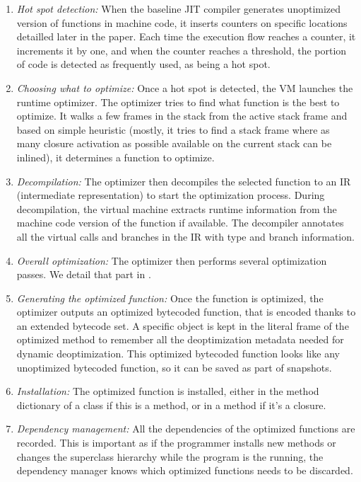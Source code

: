 \documentclass[a4paper,12pt,twoside]{../includes/ThesisStyle}
\begin{document}
\begin{enumerate}
\item \emph{Hot spot detection:} When the baseline JIT compiler  generates unoptimized version of functions in machine code, it  inserts counters on specific locations detailled later in the paper. Each time the execution flow reaches a counter, it increments it by one, and when the counter reaches a threshold, the portion of code is detected as frequently used, \ie as being a hot spot.
\item \emph{Choosing what to optimize:} Once a hot spot is detected, the VM launches the runtime optimizer. The optimizer tries to find what function is the best to optimize. It walks a few frames in the stack from the active stack frame and based on simple heuristic (mostly, it tries to find a stack frame where as many closure activation as possible available on the current stack can be inlined), it determines a function to optimize.
\item \emph{Decompilation:} The optimizer then decompiles the selected function to an IR (intermediate representation) to start the optimization process. During decompilation, the virtual machine extracts runtime information from the machine code version of the function if available. The decompiler annotates all the virtual calls and branches in the IR with type and branch information.
\item \emph{Overall optimization:} The optimizer then performs several optimization passes.  We detail that part in .
\item \emph{Generating the optimized function:} Once the function is optimized, the optimizer outputs an optimized bytecoded function, that is encoded thanks to an extended bytecode set. A specific object is kept in the literal frame of the optimized method to remember all the deoptimization metadata needed for dynamic deoptimization. This optimized bytecoded function looks like any unoptimized bytecoded function, so it can be saved as part of snapshots.
\item \emph{Installation:} The optimized function is installed, either in the method dictionary of a class if this is a method, or in a method if it's a closure.
\item \emph{Dependency management:} All the dependencies of the optimized functions are recorded. This is important as if the programmer installs new methods or changes the superclass hierarchy while the program is the running, the dependency manager knows which optimized functions needs to be discarded.
\end{enumerate}
\end{document}
